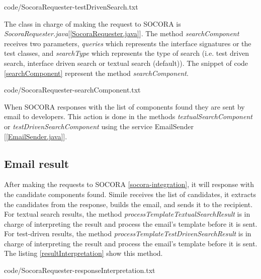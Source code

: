 {
{code/SocoraRequester-testDrivenSearch.txt}

The class in charge of making the request to SOCORA is \emph{SocoraRequester.java}[\ref{SocoraRequester.java}]. The method \emph{searchComponent} receives two parameters, \emph{queries} which represents the interface signatures or the test classes, and \emph{searchType} which represents the type of search (i.e. test driven search, interface driven search or textual search (default)). The snippet of code \ref{searchComponent} represent the method \emph{searchComponent}.


{code/SocoraRequester-searchComponent.txt}

When SOCORA responses with the list of components found they are sent by email to developers. This action is done in the methods \emph{textualSearchComponent} or \emph{testDrivenSearchComponent} using the service EmailSender [\ref{EmailSender.java}].

\subsection{Email result}
After making the requests to SOCORA \ref{socora-integration}, it will response with the candidate components found. Simile receives the list of candidates, it extracts the candidates from the response, builds the email, and sends it to the recipient. For textual search results, the method \emph{processTemplateTextualSearchResult} is in charge of interpreting the result and process the email's template before it is sent. For test-driven results, the method \emph{processTemplateTestDrivenSearchResult} is in charge of interpreting the result and process the email's template before it is sent. The listing \ref{resultInterpretation} show this method.


{code/SocoraRequester-responseInterpretation.txt}

}
